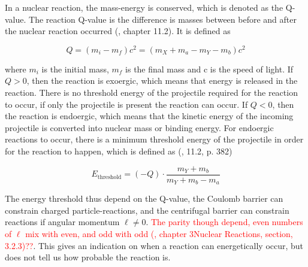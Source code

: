 In a nuclear reaction, the mass-energy is conserved, which is denoted as the Q-value. The reaction Q-value is the difference is masses between before and after the nuclear reaction occurred (\cite{KraneKennethS.Halliday1987}, chapter 11.2). It is defined as 

\begin{equation} \label{eq:Q_value}
    Q = (m_i - m_f)c^2 = (m_X + m_a - m_Y - m_b)c^2
\end{equation}

where $m_i$ is the initial mass, $m_f$ is the final mass and c is the speed of light. If $Q>0$, then the reaction is exoergic, which means that energy is released in the reaction. There is no threshold energy of the projectile required for the reaction to occur, if only the projectile is present the reaction can occur. If $Q<0$, then the reaction is endoergic, which means that the kinetic energy of the incoming projectile is converted into nuclear mass or binding energy. For endoergic reactions to occur, there is a minimum threshold energy of the projectile in order for the reaction to happen, which is defined as (\cite{KraneKennethS.Halliday1987}, 11.2, p. 382)

\begin{equation} \label{eq:reaction_threshold}
    E_\text{threshold} = (-Q) \cdot \frac{m_Y +m_b}{m_Y + m_b -m_a}
\end{equation}


The energy threshold thus depend on the Q-value, the Coulomb barrier can constrain charged particle-reactions, and the centrifugal barrier can constrain reactions if angular momentum $\ell\neq 0$. \textcolor{red}{The parity though depend, even numbers of $\ell$ mix with even, and odd with odd (\cite{Vertes2011a}, chapter 3Nuclear Reactions, section, 3.2.3)??}. This gives an indication on when a reaction can energetically occur, but does not tell us how probable the reaction is. \\%

